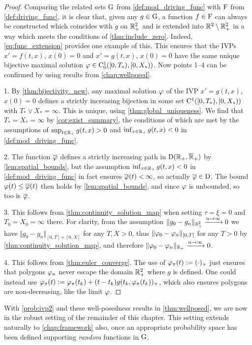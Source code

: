 \begin{proof}
    Comparing the related sets $\mathrm{G}$ from \autoref{def:mod_driving_func} with $\mathrm{F}$ from \autoref{def:driving_func}, it is clear that, given any $g\in\mathrm{G}$, a function $f\in\mathrm{F}$ can always be constructed which coincides with $g$ on $\mathbb{R}_+^2$ and is extended into $\mathbb{R}^2\setminus\mathbb{R}^2_+$ in a way which meets the conditions of \autoref{thm:include_zero}. Indeed, \autoref{eq:func_extension} provides one example of this. This ensures that the IVPs $x'=f(t,x)$, $x(0)=0$ and $x'=g(t,x)$, $x(0)=0$ have the same unique bijective maximal solution $\varphi\in\mathrm{C}^1_0([0,T_*),[0,X_*))$. Now points 1--4 can be confirmed by using results from \autoref{chap:wellposed}.

    1. By \autoref{thm:bijectivity_new}, any maximal solution $\varphi$ of the IVP $x'=g(t,x)$, $x(0)=0$ defines a strictly increasing bijection in some set $\mathrm{C}^1([0,T_*),[0,X_*))$ with $T_*\vee X_*=\infty$. This is unique, using \autoref{thm:global_uniqueness}. We find that $T_*=X_*=\infty$ by \autoref{cor:exist_summary}, the conditions of which are met by the assumptions of $\sup_{t\in\mathbb{R}_+}g(t,x)>0$ and $\inf_{x\in\mathbb{R}_+}g(t,x)<0$ in \autoref{def:mod_driving_func}.

    2. The function $\overline{\varphi}$ defines a strictly increasing path in $\mathrm{D}(\mathbb{R}_+,{\overline{\mathbb{R}}}_+)$ by \autoref{lem:spatial_bounds}, but the assumption $\inf_{x\in\mathbb{R}_+}g(t,x)<0$ in \autoref{def:mod_driving_func} in fact ensures $\overline{\varphi}(t)<\infty$, so actually $\overline{\varphi}\in\mathrm{D}$. The bound $\varphi(t)\le\overline{\varphi}(t)$ then holds by \autoref{lem:spatial_bounds}, and since $\varphi$ is unbounded, so too is $\overline{\varphi}$.

    3. This follows from \autoref{thm:continuity_solution_map} when setting $\tau=\xi=0$ and $T_0=X_0=\infty$ there. For clarity, from the assumption $\Vert g_0-g_n\Vert_{\mathbb{R}_+^2}\xrightarrow{n\to\infty}0$ we have $\Vert g_0 - g_n \Vert_{[0,T]\times[0,X]}$ for any $T,X>0$, thus $\Vert \varphi_0 - \varphi_n \Vert_{[0,T]}$ for any $T>0$ by \autoref{thm:continuity_solution_map}, and therefore $\Vert\varphi_0-\varphi_n\Vert_{\mathbb{R}_+}\xrightarrow{n\to\infty}0$.

    4. This follows from \autoref{thm:euler_converge}. The use of $\varphi_\pi(t) := (\cdot)_+$ just ensures that polygons $\varphi_n$ never escape the domain $\mathbb{R}^2_+$ where $g$ is defined. One could instead use $\varphi_\pi(t) := \varphi_\pi(t_k) + (t-t_k) g(t_k,\varphi_\pi(t_k))_+$, which also ensures polygons are non-decreasing, like the limit $\varphi$.
\end{proof}

With \autoref{prob:ivp2} and these well-posedness results in \autoref{thm:wellposed}, we are now in the robust setting of the remainder of this chapter. This setting extends naturally to \autoref{chap:framework} also, once an appropriate probability space has been defined supporting \emph{random} functions in $\mathrm{G}$.

